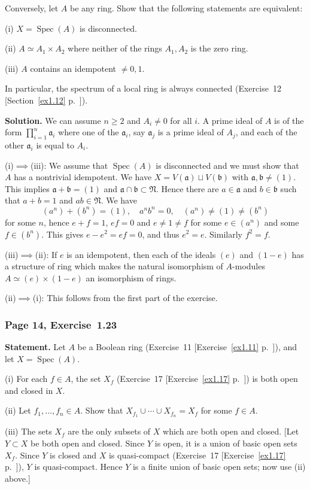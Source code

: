 \documentclass[12pt,letterpaper]{article}%
\newcommand{\mf}{\mathfrak}
\newcommand{\aaa}{\mf a}
\newcommand{\bbb}{\mf b}
\newcommand{\NNN}{\mf N}\newcommand{\RRR}{\mf R}
\newcommand{\Spec}{\operatorname{Spec}}\newcommand{\Sp}{\operatorname{Spec}}
\newcommand{\nn}{\noindent}
\begin{document}
Conversely, let $A$ be any ring. Show that the following statements are equivalent:

\nn(i) $X=\Spec(A)$ is disconnected.

\nn(ii) $A\simeq A_1\times A_2$ where neither of the rings $A_1,A_2$ is the zero ring.

\nn(iii) $A$ contains an idempotent $\ne0,1$.

In particular, the spectrum of a local ring is always connected (Exercise~12 [Section~\ref{ex1.12} p.~\pageref{ex1.12}]).

\nn\textbf{Solution.} We can assume $n\ge2$ and $A_i\ne0$ for all $i$. A prime ideal of $A$ is of the form $\prod_{i=1}^n\aaa_i$ where one of the $\aaa_i$, say $\aaa_j$ is a prime ideal of $A_j$, and each of the other $\aaa_i$ is equal to $A_i$.

\nn(i)$\implies$(iii): We assume that $\Spec(A)$ is disconnected and we must show that $A$ has a nontrivial idempotent. We have $X=V(\aaa)\sqcup V(\bbb)$ with $\aaa,\bbb\ne(1)$. This implies $\aaa+\bbb=(1)$ and $\aaa\cap\bbb\subset\NNN$. Hence there are $a\in\aaa$ and $b\in\bbb$ such that $a+b=1$ and $ab\in\NNN$. We have 
$$
(a^n)+(b^n)=(1),\quad a^nb^n=0,\quad(a^n)\ne(1)\ne(b^n)
$$ 
for some $n$, hence $e+f=1$, $ef=0$ and $e\ne1\ne f$ for some $e\in(a^n)$ and some $f\in(b^n)$. This gives $e-e^2=ef=0$, and thus $e^2=e$. Similarly $f^2=f$.

\nn(iii)$\implies$(ii): If $e$ is an idempotent, then each of the ideals $(e)$ and $(1-e)$ has a structure of ring which makes the natural isomorphism of $A$-modules $A\simeq(e)\times(1-e)$ an isomorphism of rings.

\nn(ii)$\implies$(i): This follows from the first part of the exercise.

\subsubsection{Page 14, Exercise~1.23}%

\textbf{Statement.} Let $A$ be a Boolean ring (Exercise~11 [Exercise~\ref{ex1.11} p.~\pageref{ex1.11}]), and let $X=\Spec(A)$. 

\nn(i) For each $f\in A$, the set $X_f$ (Exercise~17 [Exercise~\ref{ex1.17} p.~\pageref{ex1.17}]) is both open and closed in $X$. 

\nn(ii) Let $f_1,\ldots,f_n\in A$. Show that $X_{f_1}\cup\cdots\cup X_{f_n}=X_f$ for some $f\in A$.

\nn(iii) The sets $X_f$ are the only subsets of $X$ which are both open and closed. [Let $Y \subset X$ be both open and closed. Since $Y$ is open, it is a union of basic open sets $X_f$. Since $Y$ is closed and $X$ is quasi-compact (Exercise~17 [Exercise~\ref{ex1.17} p.~\pageref{ex1.17}]), $Y$ is quasi-compact. Hence $Y$ is a finite union of basic open sets; now use (ii) above.]
\end{document}
